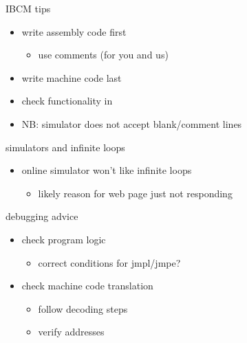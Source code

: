 \begin{frame}{IBCM tips}
\begin{itemize}
\item write assembly code first
    \begin{itemize}
    \item use comments (for you and us)
    \end{itemize}
\item write machine code last
\item check functionality in 
\item NB: simulator does not accept blank/comment lines
\end{itemize}
\end{frame}

\begin{frame}{simulators and infinite loops}
\begin{itemize}
\item online simulator won't like infinite loops
    \begin{itemize}
    \item likely reason for web page just not responding
    \end{itemize}
\end{itemize}
\end{frame}

\begin{frame}{debugging advice}
\begin{itemize}
\item check program logic
    \begin{itemize}
    \item correct conditions for jmpl/jmpe?
    \end{itemize}
\item check machine code translation
    \begin{itemize}
    \item follow decoding steps
    \item verify addresses
    \end{itemize}
\end{itemize}
\end{frame}
